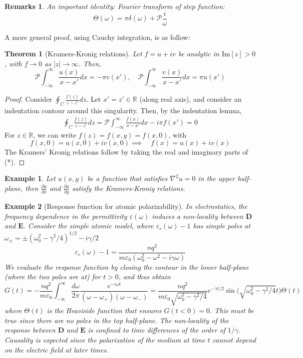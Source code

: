 \documentclass[a4paper]{article}
\newtheorem{remarks}{Remarks}[section]
\newtheorem{eg}{Example}[section]
\theoremstyle{new}
\newtheorem{thm}{Theorem}[section]
\begin{document}
\begin{remarks}
An important identity: Fourier transform of step function:
$$\Theta(\omega)=\pi\delta(\omega)+\mathcal{P}\frac{i}{\omega}$$
\end{remarks}
A more general proof, using Cauchy integration, is as follow:
\begin{thm}[Kramers-Kronig relations]
Let $f=u+iv$ be analytic in $\text{Im}[z]>0$, with $f\rightarrow0$ as $|z|\rightarrow\infty $. Then, 
$$\mathcal{P}\int_{-\infty}^{\infty}\frac{u(x)}{x-x'}dx=-\pi v(x'),\quad\mathcal{P}\int_{-\infty}^{\infty}\frac{v(x)}{x-x'}dx=\pi u(x')$$
\end{thm}
\begin{proof}
Consider $\oint_C\frac{f(z)}{z-z'}dz$. Let $x'=z'\in\mathbb{R}$ (along real axis), and consider an indentation contour around this singularity. Then, by the indentation lemma,
\begin{align*}
\oint_{C}\frac{f(z)}{z-z'}dz=\mathcal{ P}\int_{-\infty}^{\infty}\frac{f(x)}{x-x'}dx-i\pi f(x')=0\tag{*}
\end{align*}
For $z\in\mathbb{R}$, we can write $f(z)=f(x,y)=f(x,0)$, with 
$$f(x,0)=u(x,0)+iv(x,0)\implies\quad f(x)=u(x)+iv(x)$$
The Kramers' Kronig relations follow by taking the real and imaginary parts of (*).
\end{proof}
\begin{eg}
Let $u(x,y)$ be a function that satisfies $\nabla^2u=0$ in the upper half-plane, then $\frac{\partial u}{\partial x}$ and $\frac{\partial u}{\partial y}$ satisfy the Kramers-Kronig relations.
\end{eg}
\begin{eg}[Response function for atomic polarizability]
In electrostatics, the frequency dependence in the permittivity $\varepsilon(\omega)$ induces a non-locality between $\mathbf{D}$ and $\mathbf{E}$. Consider the simple atomic model, where $\varepsilon_r(\omega)-1$ has simple poles at $\omega_\pm=\pm(\omega_0^2-\gamma^2/4)^{1/2}-i\gamma/2$
$$\varepsilon_r(\omega)-1=\frac{nq^2}{m\varepsilon_0(\omega_0^2-\omega^2-i\gamma\omega)}$$
We evaluate the response function by closing the contour in the lower half-plane (where the two poles are at) for $t>0$, and thus obtain
$$G(t)=-\frac{nq^2}{m\varepsilon_0}\int_{-\infty}^\infty\frac{d\omega}{2\pi}\frac{e^{-i\omega t}}{(\omega-\omega_+)(\omega-\omega_-)}=\frac{nq^2}{m\varepsilon_0\sqrt{\omega_0^2-\gamma^2/4}}e^{-\gamma t/2}\sin\bigg(\sqrt{\omega_0^2-\gamma^2/4}t\bigg)\Theta(t)$$
where $\Theta(t)$ is the Heaviside function that ensures $G(t<0)=0$. This must be true since there are no poles in the top half-plane. The non-locality of the response between $\mathbf{D}$ and $\mathbf{E}$ is confined to time differences of the order of $1/\gamma$. Causality is expected since the polarization of the medium at time $t$ cannot depend on the electric field at later times. 
\end{eg}
\end{document}
